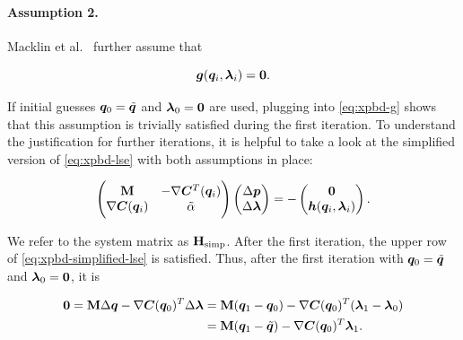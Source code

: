 \paragraph{Assumption 2.} Macklin et al.\ \cite{macklin2016} further assume that 

\begin{equation}\label{eq:xpbd-assumption-2}
    \bm{g}(\bm{q}_i, \bm{\lambda}_i) = \bm{0}. 
\end{equation}

\noindent If initial guesses
$\bm{q}_0 = \tilde{\bm{q}}$ and $\bm{\lambda}_0 = \bm{0}$ are used, plugging into \autoref{eq:xpbd-g} shows that this assumption is trivially
satisfied during the first iteration. To understand the justification for further iterations, it is helpful to take a look at the simplified
version of \autoref{eq:xpbd-lse} with both assumptions in place:

\begin{equation}\label{eq:xpbd-simplified-lse}
    \begin{pmatrix}
        \mathbf{M} & -\nabla\bm{C}^T(\bm{q}_i) \\
        \nabla \bm{C}(\bm{q}_i) & \tilde{\mathbf{\alpha}}
    \end{pmatrix}
    \begin{pmatrix}
        \Delta \bm{p} \\
        \Delta \bm{\lambda}
    \end{pmatrix}
    = -
    \begin{pmatrix}
    \bm{0} \\
    \bm{h}(\bm{q}_i, \bm{\lambda}_i)
    \end{pmatrix}.
\end{equation}

\noindent We refer to the system matrix as $\mathbf{H}_{\text{simp}}$. After the first iteration, the upper row of \autoref{eq:xpbd-simplified-lse} 
is satisfied. Thus, after the first iteration with $\bm{q}_0 = \tilde{\bm{q}}$ and $\bm{\lambda}_0 = \bm{0}$, it is

\begin{equation}
\begin{split}
    \bm{0} = \mathbf{M}\Delta\bm{q} - \nabla \bm{C}(\bm{q}_0)^T \Delta \bm{\lambda} &= \mathbf{M}(\bm{q}_1 - \bm{q}_0) - \nabla \bm{C}(\bm{q}_0)^T 
    (\bm{\lambda}_1 - \bm{\lambda}_0) \\
    &= \mathbf{M}(\bm{q}_1 - \tilde{\bm{q}}) - \nabla \bm{C}(\bm{q}_0)^T \bm{\lambda}_1. \label{eq:xpbd-assumption-2-detail}
\end{split}
\end{equation}

